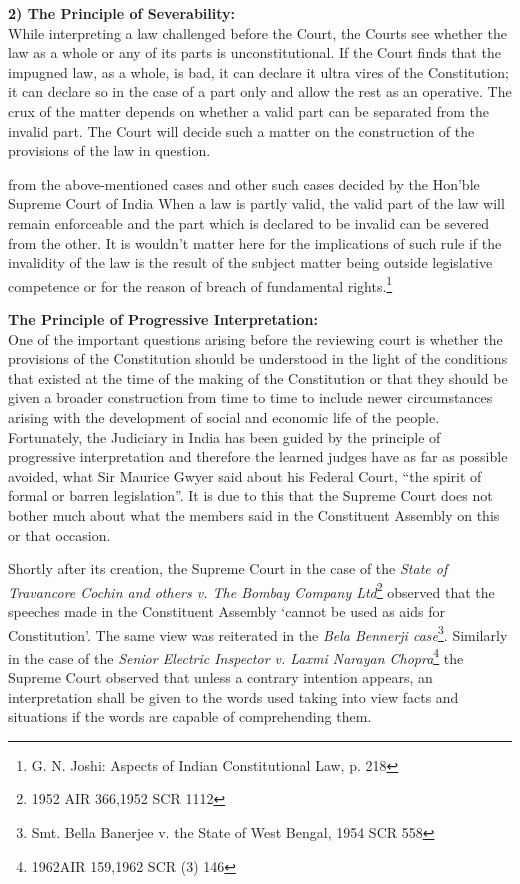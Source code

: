 \begin{multicols}{2}
\newpage

\noi
{\bf 2) The Principle of Severability:}\\[.2cm] While interpreting a law challenged before the Court, the Courts see whether the law
as a whole or any of its parts is unconstitutional. If the Court finds that the impugned
law, as a whole, is bad, it can declare it ultra vires of the Constitution; it can declare so
in the case of a part only and allow the rest as an operative. The crux of the matter
depends on whether a valid part can be separated from the invalid part. The Court will
decide such a matter on the construction of the provisions of the law in question.

\noi
from the above-mentioned cases and other such cases decided by the Hon’ble Supreme
Court of India When a law is partly valid, the valid part of the law will remain
enforceable and the part which is declared to be invalid can be severed from the other.
It is wouldn’t matter here for the implications of such rule if the invalidity of the law is
the result of the subject matter being outside legislative competence or for the reason
of breach of fundamental rights.\footnote{G. N. Joshi: Aspects of Indian Constitutional Law, p. 218}

\noi
{\bf The Principle of Progressive Interpretation: }\\[0.2cm] One of the important questions arising before the reviewing court is whether the
provisions of the Constitution should be understood in the light of the conditions that
existed at the time of the making of the Constitution or that they should be given a
broader construction from time to time to include newer circumstances arising with the
development of social and economic life of the people. Fortunately, the Judiciary in
India has been guided by the principle of progressive interpretation and therefore the
learned judges have as far as possible avoided, what Sir Maurice Gwyer said about his
Federal Court, “the spirit of formal or barren legislation”. It is due to this that the
Supreme Court does not bother much about what the members said in the Constituent
Assembly on this or that occasion. 

\noi
Shortly after its creation, the Supreme Court in the case of the \textit{State of Travancore
Cochin and others v. The Bombay Company Ltd}\footnote{1952 AIR 366,1952 SCR 1112}
observed that the speeches made in
the Constituent Assembly ‘cannot be used as aids for Constitution’. The same view was reiterated in the \textit{Bela Bennerji case}\footnote{Smt. Bella Banerjee v. the State of West Bengal, 1954 SCR 558}. Similarly in the case of the \textit{Senior Electric
Inspector v. Laxmi Narayan Chopra}\footnote{1962AIR 159,1962 SCR (3) 146} the Supreme Court observed that unless a
contrary intention appears, an interpretation shall be given to the words used taking into
view facts and situations if the words are capable of comprehending them.


\end{multicols}
